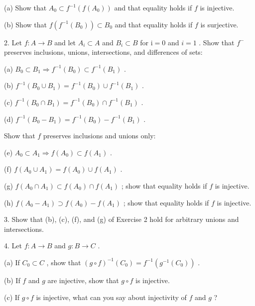 \documentclass[10pt]{article}
\begin{document}
(a) Show that \({A}_{0} \subset  {f}^{-1}\left( {f\left( {A}_{0}\right) }\right)\) and that equality holds if \(f\) is injective.

(b) Show that \(f\left( {{f}^{-1}\left( {B}_{0}\right) }\right)  \subset  {B}_{0}\) and that equality holds if \(f\) is surjective.

2. Let \(f : A \rightarrow  B\) and let \({A}_{i} \subset  A\) and \({B}_{i} \subset  B\) for \(\mathrm{i} = 0\) and \(i = 1\) . Show that \({f}^{ - }\) preserves inclusions, unions, intersections, and differences of sets:

(a) \({B}_{0} \subset  {B}_{1} \Rightarrow  {f}^{-1}\left( {B}_{0}\right)  \subset  {f}^{-1}\left( {B}_{1}\right)\) .

(b) \({f}^{-1}\left( {{B}_{0} \cup  {B}_{1}}\right)  = {f}^{-1}\left( {B}_{0}\right)  \cup  {f}^{-1}\left( {B}_{1}\right)\) .

(c) \({f}^{-1}\left( {{B}_{0} \cap  {B}_{1}}\right)  = {f}^{-1}\left( {B}_{0}\right)  \cap  {f}^{-1}\left( {B}_{1}\right)\) .

(d) \({f}^{-1}\left( {{B}_{0} - {B}_{1}}\right)  = {f}^{-1}\left( {B}_{0}\right)  - {f}^{-1}\left( {B}_{1}\right)\) .

Show that \(f\) preserves inclusions and unions only:

(e) \({A}_{0} \subset  {A}_{1} \Rightarrow  f\left( {A}_{0}\right)  \subset  f\left( {A}_{1}\right)\) .

(f) \(f\left( {{A}_{0} \cup  {A}_{1}}\right)  = f\left( {A}_{0}\right)  \cup  f\left( {A}_{1}\right)\) .

(g) \(f\left( {{A}_{0} \cap  {A}_{1}}\right)  \subset  f\left( {A}_{0}\right)  \cap  f\left( {A}_{1}\right)\) ; show that equality holds if \(f\) is injective.

(h) \(f\left( {{A}_{0} - {A}_{1}}\right)  \supset  f\left( {A}_{0}\right)  - f\left( {A}_{1}\right)\) ; show that equality holds if \(f\) is injective.

3. Show that (b), (c), (f), and (g) of Exercise 2 hold for arbitrary unions and intersections.

4. Let \(f : A \rightarrow  B\) and \(g : B \rightarrow  C\) .

(a) If \({C}_{0} \subset  C\) , show that \({\left( g \circ  f\right) }^{-1}\left( {C}_{0}\right)  = {f}^{-1}\left( {{g}^{-1}\left( {C}_{0}\right) }\right)\) .

(b) If \(f\) and \(g\) are injective, show that \(g \circ  f\) is injective.

(c) If \(g \circ  f\) is injective, what can you say about injectivity of \(f\) and \(g\) ?
\end{document}
